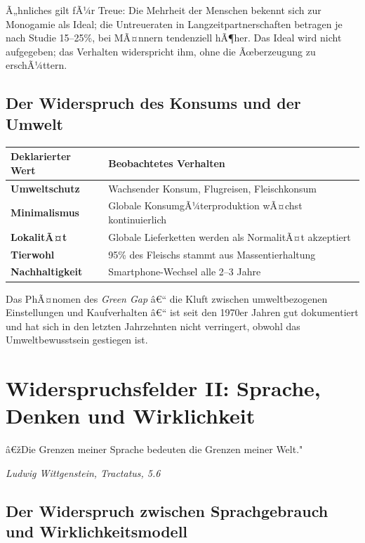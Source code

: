 ﻿\documentclass[12pt, a4paper]{article}
\begin{document}
Ã„hnliches gilt fÃ¼r Treue: Die Mehrheit der Menschen bekennt sich zur
Monogamie als Ideal; die Untreueraten in Langzeitpartnerschaften betragen
je nach Studie 15--25\%, bei MÃ¤nnern tendenziell hÃ¶her. Das Ideal wird nicht
aufgegeben; das Verhalten widerspricht ihm, ohne die Ãœberzeugung zu erschÃ¼ttern.

\subsection{Der Widerspruch des Konsums und der Umwelt}

\medskip
\begin{tabular}{>{\bfseries}p{5cm} p{8cm}}
\toprule
Deklarierter Wert & Beobachtetes Verhalten \\
\midrule
Umweltschutz & Wachsender Konsum, Flugreisen, Fleischkonsum \\
Minimalismus & Globale KonsumgÃ¼terproduktion wÃ¤chst kontinuierlich \\
LokalitÃ¤t & Globale Lieferketten werden als NormalitÃ¤t akzeptiert \\
Tierwohl & 95\% des Fleischs stammt aus Massentierhaltung \\
Nachhaltigkeit & Smartphone-Wechsel alle 2--3 Jahre \\
\bottomrule
\end{tabular}
\medskip

Das PhÃ¤nomen des \emph{Green Gap} â€“ die Kluft zwischen umweltbezogenen
Einstellungen und Kaufverhalten â€“ ist seit den 1970er Jahren gut dokumentiert
und hat sich in den letzten Jahrzehnten nicht verringert, obwohl das
Umweltbewusstsein gestiegen ist.

\section{Widerspruchsfelder II: Sprache, Denken und Wirklichkeit}

\epigraph{â€žDie Grenzen meiner Sprache bedeuten die Grenzen meiner Welt."}%
{\textit{Ludwig Wittgenstein, Tractatus, 5.6}}

\subsection{Der Widerspruch zwischen Sprachgebrauch und Wirklichkeitsmodell}
\end{document}

